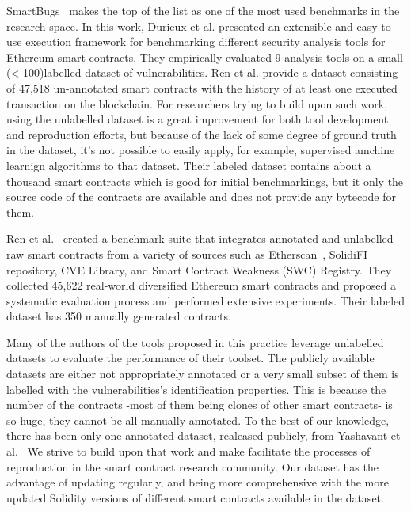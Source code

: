 	SmartBugs~\cite{Empirical-Review-of-Automated-Analysis-Tools-on-47587-Ethereum-Smart-Contracts} makes the top of the list as one of the most used benchmarks in the research space.
	In this work, Durieux et al. presented an extensible and easy-to-use execution framework for benchmarking different security analysis tools for Ethereum smart contracts.
	They empirically evaluated 9 analysis tools on a small (< 100)labelled  dataset of vulnerabilities.
	Ren et al. provide a dataset consisting of 47,518 un-annotated smart contracts with the history of at least one executed transaction on the blockchain.
	For researchers trying to build upon such work, using the unlabelled dataset is a great improvement for both tool development and reproduction efforts, but because of the lack of some degree of ground truth in the dataset, it's not possible to easily apply, for example, supervised amchine learnign algorithms to that dataset.
	Their labeled dataset contains about a thousand smart contracts which is good for initial benchmarkings, but it only the source code of the contracts are available and does not provide any bytecode for them.

	Ren et al.~\cite{Empirical-Evaluation-of-Smart-Contract-Testing:What-is-the-Best-Choice} created a benchmark suite that integrates annotated and unlabelled raw smart contracts from a variety of sources
	such as Etherscan~\cite{etherscan}, SolidiFI repository, CVE Library, and Smart Contract Weakness (SWC) Registry.
	They collected 45,622 real-world diversified Ethereum smart contracts and proposed a systematic evaluation process and performed extensive experiments.
	Their labeled dataset has 350 manually generated contracts.

	Many of the authors of the tools proposed in this practice leverage unlabelled datasets to evaluate the performance of their toolset.
	The publicly available datasets are either not appropriately annotated or a very small subset of them is labelled with the vulnerabilities's identification properties.
	This is because the number of the contracts -most of them being clones of other smart contracts- is so huge, they cannot be all manually annotated.
	To the best of our knowledge, there has been only one annotated dataset, realeased publicly, from Yashavant et al.~\cite{yashavant2022scrawld}
	We strive to build upon that work and make facilitate the processes of reproduction in the smart contract research community.
	Our dataset has the advantage of updating regularly, and being more comprehensive with the more updated Solidity versions of different smart contracts available in the dataset.


